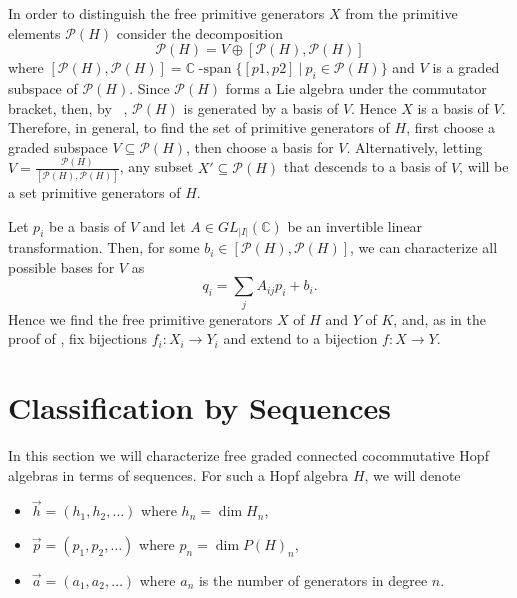 \documentclass[11pt]{amsart}
\theoremstyle{definition}
\numberwithin{equation}{section}
\def\CC{{\mathbb C}}
\begin{document}
In order to distinguish the free primitive generators \(X\)
from the primitive elements \(\mathcal{P}(H)\) consider the decomposition \[
    \mathcal{P}(H) = V \oplus [\mathcal{P}(H), \mathcal{P}(H)]
\] where \([\mathcal{P}(H), \mathcal{P}(H)] = \CC\operatorname{-span}\{[p1,p2] \: \vert \: p_i \in \mathcal{P}(H)\}\) and
\(V\) is a graded subspace of \(\mathcal{P}(H)\). Since \(\mathcal{P}(H)\) forms a Lie algebra under the commutator bracket,
then, by ~\cite[Prop 2.2]{F23}, \(\mathcal{P}(H)\) is generated by a basis of \(V\). Hence \(X\) is a basis of \(V\). Therefore, in general,
to find the set of primitive generators of \(H\), first choose a graded subspace \(V \subseteq \mathcal{P}(H)\), then choose a basis for \(V\).
Alternatively, letting \(V = \frac{\mathcal{P}(H)}{[\mathcal{P}(H), \mathcal{P}(H)]}\),
 any subset \(X' \subseteq \mathcal{P}(H)\) that descends to a basis of \(V\), will be a set primitive generators of \(H\).

Let \(p_i\) be a basis of \(V\) and let  \(A \in GL_{|I|}(\CC)\) be an invertible linear transformation.
Then, for some  \(b_i \in [\mathcal{P}(H), \mathcal{P}(H)]\),
we can characterize all possible bases for \(V\) as \[
    q_i = \sum_jA_{ij}p_i + b_i.
\]
Hence we find the free primitive generators \(X\) of \(H\) and \(Y\) of \(K\), and, as in the proof of
\cite{AT22}, fix bijections \(f_i: X_i  \to Y_i\) and extend to a bijection
\(f:X \to Y\).

\section{Classification by Sequences}

In this section we will characterize free graded connected cocommutative Hopf algebras in terms of sequences. For such a Hopf algebra $H$, we will denote
\begin{itemize} 
    \item $\vec{h} = (h_1, h_2, \ldots)$ where $h_n = \dim H_n$,
    \item $\vec{p} = (p_1, p_2, \ldots)$ where $p_n = \dim P(H)_n$,
    \item $\vec{a} = (a_1, a_2, \ldots)$ where $a_n$ is the number of generators in degree $n$.
\end{itemize}
\end{document}
